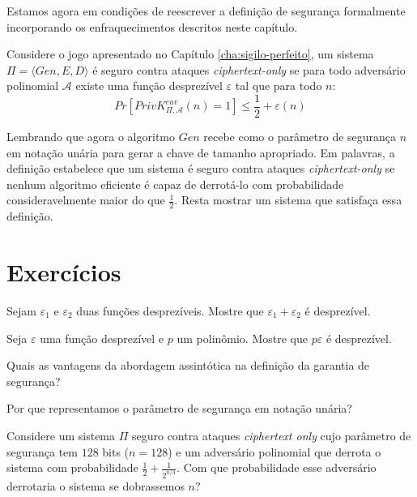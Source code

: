 Estamos agora em condições de reescrever a definição de segurança formalmente incorporando os enfraquecimentos descritos neste capítulo.

\begin{definition}
  Considere o jogo apresentado no Capítulo \ref{cha:sigilo-perfeito}, um sistema $\Pi = \langle Gen, E, D \rangle$ é seguro contra ataques {\em ciphertext-only} se para todo adversário polinomial $\mathcal{A}$ existe uma função desprezível $\varepsilon$ tal que para todo $n$:
\begin{displaymath}
  Pr[PrivK^{eav}_{\Pi, \mathcal{A}}(n) = 1] \leq \frac{1}{2} + \varepsilon(n)
\end{displaymath}
\end{definition}

Lembrando que agora o algoritmo $Gen$ recebe como o parâmetro de segurança $n$ em notação unária para gerar a chave de tamanho apropriado.
Em palavras, a definição estabelece que um sistema é seguro contra ataques {\em ciphertext-only} se nenhum algoritmo eficiente é capaz de derrotá-lo com probabilidade consideravelmente maior do que $\frac{1}{2}$.
Resta mostrar um sistema que satisfaça essa definição.


\section{Exercícios}
\label{sec:exercicios}


\begin{exercicio}
  Sejam $\varepsilon_1$ e $\varepsilon_2$ duas funções desprezíveis. 
  Mostre que $\varepsilon_1 + \varepsilon_2$ é desprezível.
\end{exercicio}

\begin{exercicio}
  Seja $\varepsilon$ uma função desprezível e $p$ um polinômio. 
  Mostre que $p\varepsilon$ é desprezível.
\end{exercicio}


\begin{exercicio}
  Quais as vantagens da abordagem assintótica na definição da garantia de segurança?
\end{exercicio}

\begin{exercicio}
  Por que representamos o parâmetro de segurança em notação unária?
\end{exercicio}

\begin{exercicio}
  Considere um sistema $\Pi$ seguro contra ataques {\em ciphertext only} cujo parâmetro de segurança tem $128$ bits ($n = 128$) e um adversário polinomial que derrota o sistema com probabilidade $\frac{1}{2} + \frac{1}{2^{n/4}}$.
Com que probabilidade esse adversário derrotaria o sistema se dobrassemos $n$?
\end{exercicio}


